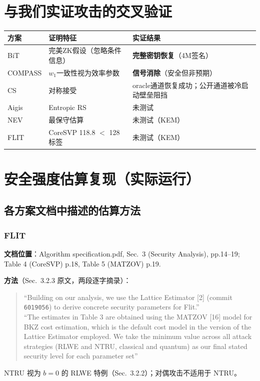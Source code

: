 \documentclass[11pt,a4paper]{ctexart}
\begin{document}
\section{与我们实证攻击的交叉验证}

\begin{keybox}
\begin{tabular}{lll}
方案 & 证明特征 & 实证结果 \\
\midrule
BiT & 完美ZK假设（忽略条件信息） & \textbf{完整密钥恢复}（4M签名） \\
COMPASS & $w_1$一致性视为效率参数 & \textbf{信号消除}（安全但非预期） \\
CS & 对称接受 & oracle通道恢复成功；公开通道被冷启动壁垒阻挡 \\
Aigis & Entropic RS & 未测试 \\
NEV & 最保守估算 & 未测试（KEM） \\
FLIT & CoreSVP 118.8 $<$ 128 标签 & 未测试（KEM） \\
\end{tabular}
\end{keybox}


\section{安全强度估算复现（实际运行）}\label{sec:repro}

\subsection{各方案文档中描述的估算方法}

\subsubsection{FLIT}

\textbf{文档位置}：Algorithm specification.pdf, Sec.~3 (Security Analysis), pp.14--19; Table 4 (CoreSVP) p.18, Table 5 (MATZOV) p.19.

\textbf{方法}（Sec.~3.2.3 原文，两段逐字摘录）：
\begin{quote}\small
``Building on our analysis, we use the Lattice Estimator [2] (commit \texttt{6019056}) to derive concrete security parameters for Flit.''\\[0.3em]
``The estimates in Table 3 are obtained using the MATZOV [16] model for BKZ cost estimation, which is the default cost model in the version of the Lattice Estimator employed. We take the minimum value across all attack strategies (RLWE and NTRU, classical and quantum) as our final stated security level for each parameter set''
\end{quote}
NTRU 视为 $b{=}0$ 的 RLWE 特例（Sec.~3.2.2）；对偶攻击不适用于 NTRU。
\end{document}
